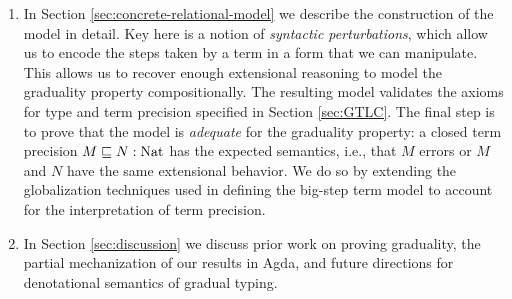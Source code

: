 \begin{enumerate}
\item In Section \ref{sec:concrete-relational-model} we describe the
  construction of the model in detail. Key here is a notion of \emph{syntactic
  perturbations}, which allow us to encode the steps taken by a term in a form
  that we can manipulate. This allows us to recover enough extensional reasoning
  to model the graduality property compositionally.
  The resulting model validates the axioms for type and term precision specified
  in Section \ref{sec:GTLC}. The final step is to prove that the model is
  \emph{adequate} for the graduality property: a closed term precision $M \sqsubseteq
  N : \text{Nat}$ has the expected semantics, i.e., that $M$ errors or $M$ and $N$
  have the same extensional behavior. We do so by extending the globalization
  techniques used in defining the big-step term model to account for the
  interpretation of term precision.
\item In Section \ref{sec:discussion} we discuss prior work on proving
  graduality, the partial mechanization of our results in Agda, and
  future directions for denotational semantics of gradual typing.
\end{enumerate}
